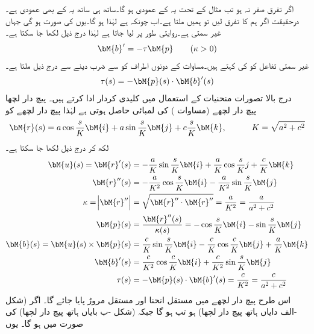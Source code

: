 اگر تفرق  صفر نہ ہو تب مثال  کے تحت یہ  کے عمودی ہو گا۔ساتھ ہی ساتھ یہ  کے بھی عمودی ہے۔درحقیقت اگر ہم  کا تفرق لیں تو ہمیں  ملتا ہے۔اب چونکہ  ہے لہٰذا  ہو گا۔یوں  کی صورت  ہو گی جہاں  غیر سمتی ہے۔روایتی طور پر  لیا جاتا ہے لہٰذا درج ذیل لکھا جا سکتا ہے۔
\begin{align}\label{مساوات_الاحصاء_مروڑ_الف}
\bM{b}'=-\tau \bM{p} \quad \quad (\kappa >0)
\end{align}
غیر سمتی تفاعل  کو  کی  کہتے ہیں۔مساوات   کے دونوں اطراف کو  سے ضرب دینے سے درج ذیل ملتا ہے۔
\begin{align}\label{مساوات_الاحصاء_مروڑ_ب}
\tau(s)=-\bM{p}(s)\cdot \bM{b}'(s)
\end{align}
درج بالا تصورات منحنیات کے استعمال میں کلیدی کردار ادا کرتے ہیں۔ 
\quad پیچ دار لچھا\\
پیچ دار لچھے  (مساوات ) کی لمبائی  حاصل ہوتی ہے لہٰذا پیچ دار لچھے کو
\begin{align*}
\bM{r}(s)=a\cos \frac{s}{K}\bM{i}+a\sin \frac{s}{K}\bM{j}+c\frac{s}{K}\bM{k}, \quad \quad \quad K=\sqrt{a^2+c^2} 
\end{align*}
لکھ کر درج ذیل لکھا جا سکتا ہے۔
\begin{align*}
\bM{u}(s)=\bM{r}'(s)&=-\frac{a}{K}\sin \frac{s}{K}\bM{i}+\frac{a}{K}\cos \frac{s}{K}j+\frac{c}{K}\bM{k}\\
\bM{r}''(s)&=-\frac{a}{K^2}\cos \frac{s}{K}\bM{i}-\frac{a}{K^2}\sin \frac{s}{K}\bM{j}\\
\kappa=\abs{\bM{r}''}&=\sqrt{\bM{r}''\cdot\bM{r}''}=\frac{a}{K^2}=\frac{a}{a^2+c^2}\\
\bM{p}(s)&=\frac{\bM{r}''(s)}{\kappa(s)}=-\cos \frac{s}{K}\bM{i}-\sin\frac{s}{K}\bM{j}\\
\bM{b}(s)=\bM{u}(s)\times \bM{p}(s)&=\frac{c}{K}\sin \frac{s}{K}\bM{i}-\frac{c}{K}\cos \frac{c}{K}\bM{j}+\frac{a}{K}\bM{k}\\
\bM{b}'(s)&=\frac{c}{K^2}\cos \frac{c}{K}\bM{i}+\frac{c}{K^2}\sin \frac{s}{K}\bM{j}\\
\tau(s)&=-\bM{p}(s)\cdot \bM{b}'(s)=\frac{c}{K^2}=\frac{c}{a^2+c^2}
\end{align*}
اس طرح پیچ دار لچھے میں  مستقل  انحنا اور مستقل مروڑ پایا جائے گا۔ اگر  (شکل -الف دایاں ہاتھ پیچ دار لچھا) ہو تب  ہو گا جبکہ  (شکل -ب  بایاں ہاتھ پیچ دار لچھا) کی صورت میں  ہو گا۔ 
یوں

